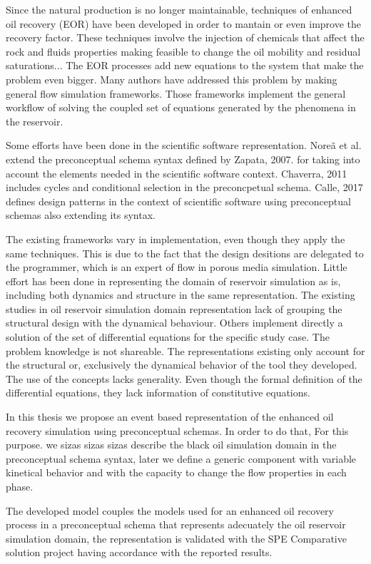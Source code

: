 Since the natural production is no longer maintainable, techniques of enhanced oil recovery (EOR) have been developed in order to mantain or even improve the recovery factor. These techniques involve the injection of chemicals that affect the rock and fluids properties making feasible to change the oil mobility and residual saturations... The EOR processes add new equations to the system that make the problem even bigger. Many authors have addressed this problem by making general flow simulation frameworks. Those frameworks implement the general workflow of solving the coupled set of equations generated by the phenomena in the reservoir.

Some efforts have been done in the scientific software representation. Nore\~{a} et al. extend the preconceptual schema syntax defined by Zapata, 2007. for taking into account the elements needed in the scientific software context. Chaverra, 2011 includes cycles and conditional selection in the preconcpetual schema. Calle, 2017 defines design patterns in the context of scientific software using preconceptual schemas also extending its syntax.


The existing frameworks vary in implementation, even though they apply the same techniques. This is due to the fact that the design desitions are delegated to the programmer, which is an expert of flow in porous media simulation. Little effort has been done in representing the domain of reservoir simulation as is, including both dynamics and structure in the same representation. The existing studies in oil reservoir simulation domain representation lack of grouping the structural design with the dynamical behaviour. Others implement directly a solution of the set of differential equations for the specific study case. The problem knowledge is not shareable. The representations existing only account for the structural or, exclusively the dynamical behavior of the tool they developed. The use of the concepts lacks generality. Even though the formal definition of the differential equations, they lack information of constitutive equations. 

In this thesis we propose an event based representation of the enhanced oil recovery simulation using preconceptual schemas. In order to do that, For this purpose. we sizas sizas sizas describe the black oil simulation domain in the preconceptual schema syntax, later we define a generic component with variable kinetical behavior and with the capacity to change the flow properties in each phase.

The developed model couples the models used for an enhanced oil recovery process in a preconceptual schema that represents adecuately the oil reservoir simulation domain, the representation is validated with the SPE Comparative solution project having accordance with the reported results.